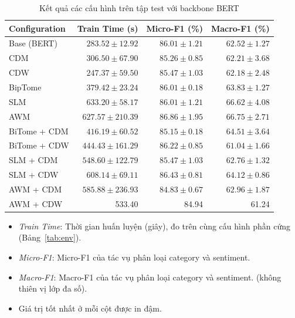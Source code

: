 \begin{table}[H]
\centering
\small
\caption{Kết quả các cấu hình trên tập test với backbone BERT}
\label{tab:bert_results}
\begin{tabular}{@{}lrrr@{}}
\toprule
\textbf{Configuration}
&
\textbf{Train Time (s)}
&
\textbf{Micro-F1 (\%)}
&
\textbf{Macro-F1 (\%)} \\
\midrule

Base (BERT)
& $283.52 \pm 12.92$
& $86.01 \pm 1.21$
& $62.52 \pm 1.27$ \\

CDM
& $306.50 \pm 67.90$
& $85.26 \pm 0.85$
& $62.21 \pm 3.68$ \\

CDW
& $\mathbf{247.37 \pm 59.50}$
& $85.47 \pm 1.03$
& $62.18 \pm 2.48$ \\

BipTome
& $379.42 \pm 23.24$
& $86.01 \pm 0.18$
& $63.83 \pm 1.27$ \\

SLM
& $633.20 \pm 58.17$
& $86.01 \pm 1.21$
& $66.62 \pm 4.08$ \\

AWM
& $627.57 \pm 210.39$
& $\mathbf{86.86 \pm 1.95}$
& $\mathbf{66.75 \pm 2.71}$ \\

BiTome + CDM
& $416.19 \pm 60.52$
& $85.15 \pm 0.18$
& $64.51 \pm 3.64$ \\

BiTome + CDW
& $444.43 \pm 161.29$
& $86.22 \pm 0.85$
& $61.04 \pm 1.66$ \\

SLM + CDM
& $548.60 \pm 122.79$
& $85.47 \pm 1.03$
& $62.76 \pm 1.32$ \\

SLM + CDW
& $608.14 \pm 69.11$
& $86.43 \pm 0.81$
& $64.12 \pm 0.86$ \\

AWM + CDM
& $585.88 \pm 236.93$
& $84.83 \pm 0.67$
& $62.96 \pm 1.87$ \\

AWM + CDW
& 533.40
& 84.94
& 61.24 \\

\bottomrule
\end{tabular}
\end{table}

\begin{itemize}
  \item \textit{Train Time}: Thời gian huấn luyện (giây), đo trên cùng
        cấu hình phần cứng (Bảng~\ref{tab:env}).
  \item \textit{Micro-F1}: Micro-F1 của tác vụ phân loại category và sentiment.
  \item \textit{Macro-F1}: Macro-F1 của tác vụ phân loại category và sentiment.
        (không thiên vị lớp đa số).

  \item Giá trị tốt nhất ở mỗi cột được in đậm.
\end{itemize}

